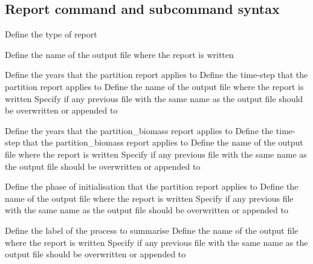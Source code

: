 \subsection{Report command and subcommand syntax}\par
{}\par\par
{} {Define the type of report}
\par\textbf{}\par
{} {Define the name of the output file where the report is written}
\par\textbf{}\par
{} {Define the years that the partition report applies to}
 {Define the time-step that the partition report applies to}
 {Define the name of the output file where the report is written}
 {Specify if any previous file with the same name as the output file should be overwritten or appended to}
\par\textbf{}\par
{} {Define the years that the partition\_biomass report applies to}
 {Define the time-step that the partition\_biomass report applies to}
 {Define the name of the output file where the report is written}
 {Specify if any previous file with the same name as the output file should be overwritten or appended to}
\par\textbf{}\par
{} {Define the phase of initialisation that the partition report applies to}
 {Define the name of the output file where the report is written}
 {Specify if any previous file with the same name as the output file should be overwritten or appended to}
\par\textbf{}\par
{} {Define the label of the process to summarise}
 {Define the name of the output file where the report is written}
 {Specify if any previous file with the same name as the output file should be overwritten or appended to}
\par\textbf{}\par
